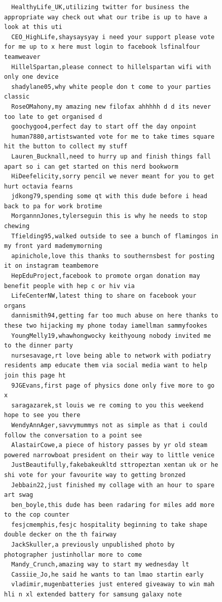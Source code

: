 \begin{figure}[htpb]
\begin{verbatim}
  HealthyLife_UK,utilizing twitter for business the appropriate way check out what our tribe is up to have a look at this uti
  CEO_HighLife,shaysaysyay i need your support please vote for me up to x here must login to facebook lsfinalfour teamweaver
  HillelSpartan,please connect to hillelspartan wifi with only one device
  shadylane05,why white people don t come to your parties classic
  RoseOMahony,my amazing new filofax ahhhhh d d its never too late to get organised d
  goochygoo4,perfect day to start off the day onpoint
  human7880,artistswanted vote for me to take times square hit the button to collect my stuff
  Lauren_Bucknall,need to hurry up and finish things fall apart so i can get started on this nerd bookworm
  HiDeefelicity,sorry pencil we never meant for you to get hurt octavia fearns
  jdkong79,spending some qt with this dude before i head back to pa for work brotime
  MorgannnJones,tylerseguin this is why he needs to stop chewing
  Tfielding95,walked outside to see a bunch of flamingos in my front yard mademymorning
  apinichole,love this thanks to southernsbest for posting it on instagram teambemore
  HepEduProject,facebook to promote organ donation may benefit people with hep c or hiv via
  LifeCenterNW,latest thing to share on facebook your organs
  dannismith94,getting far too much abuse on here thanks to these two hijacking my phone today iamellman sammyfookes
  YoungMelly19,whawhongwocky keithyoung nobody invited me to the dinner party
  nursesavage,rt love being able to network with podiatry residents amp educate them via social media want to help join this page ht
  9JGEvans,first page of physics done only five more to go x
  saragazarek,st louis we re coming to you this weekend hope to see you there
  WendyAnnAger,savvymummys not as simple as that i could follow the conversation to a point see
  AlastairCowe,a piece of history passes by yr old steam powered narrowboat president on their way to little venice
  JustBeautifully,fakebakeukltd sttropeztan xentan uk or he shi vote for your favourite way to getting bronzed
  Jebbain22,just finished my collage with an hour to spare art swag
  ben_boyle,this dude has been radaring for miles add more to the cop counter
  fesjcmemphis,fesjc hospitality beginning to take shape double decker on the th fairway
  JackSkuller,a previously unpublished photo by photographer justinhollar more to come
  Mandy_Crunch,amazing way to start my wednesday lt
  Cassiie_Jo,he said he wants to tan lmao startin early
  vladimir,mugenbatteries just entered giveaway to win mah hli n xl extended battery for samsung galaxy note

\end{verbatim}
\end{figure}
